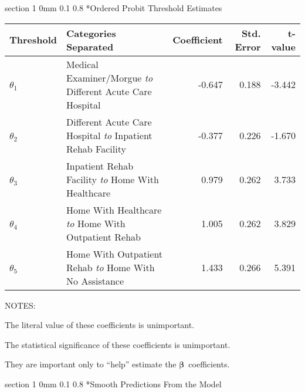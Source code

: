 \documentclass[12pt]{article}
\makeatletter
\newcommand{\9}{\\[9pt]}
\newcommand{\bgm}{\color{MyMath}}
\newcommand{\egm}{\color{white}}
\renewcommand{\section}{\@startsection
	    {section}%
	    {1}%
	    {0mm}%
	    {0.1\baselineskip}%
	    {0.8\baselineskip}%
	    {\newpage \color[cmyk]{0.43,0,0.01,0} \center\LARGE}}%
\makeatother
\begin{document}
\begin{landscape}
\begin{Large}
{\section*{Ordered Probit Threshold Estimates}
\begin{large}
\begin{center}
\begin{tabular}{llrrr}
    Threshold  & Categories Separated                                             & Coefficient & Std. Error    & t-value \\
    \hline
    \bgm$\theta_1$\egm\ & Medical Examiner/Morgue \emph{to} Different Acute Care Hospital  & -0.647      & 0.188         & -3.442 \\
    \bgm$\theta_2$\egm\ & Different Acute Care Hospital \emph{to} Inpatient Rehab Facility & -0.377      & 0.226         & -1.670 \\
    \bgm$\theta_3$\egm\ & Inpatient Rehab Facility \emph{to} Home With Healthcare          &  0.979      & 0.262         &  3.733 \\
    \bgm$\theta_4$\egm\ & Home With Healthcare \emph{to} Home With Outpatient Rehab        &  1.005      & 0.262         &  3.829 \\
    \bgm$\theta_5$\egm\ & Home With Outpatient Rehab \emph{to} Home With No Assistance     &  1.433      & 0.266         &  5.391 \\
    \hline
\end{tabular}
\end{center}
\end{large}

\vspace{1in}
\noindent NOTES:
\begin{ohlist}
    \item   The literal value of these coefficients is unimportant.
    \item   The statistical significance of these coefficients is unimportant.
    \item   They are important only to ``help'' estimate the \bgm$\boldsymbol{\beta}$\egm\ coefficients.  
\end{ohlist}

\section*{Smooth Predictions From the Model}
\begin{center}
\end{center}

}
\end{Large}
\end{landscape}
\end{document}
